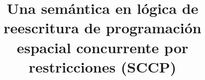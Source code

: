 \title{Una sem\'antica en l\'ogica de reescritura de programaci\'on espacial concurrente por restricciones (SCCP)}
